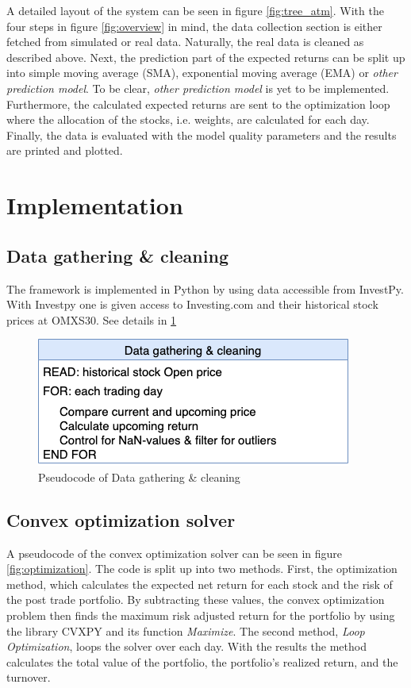 \documentclass{LTHtwocol} %
\begin{document}
A detailed layout of the system can be seen in figure \ref{fig:tree_atm}. With the four steps in figure \ref{fig:overview} in mind, the data collection section is either fetched from simulated or real data. Naturally, the real data is cleaned as described above. Next, the prediction part of the expected returns can be split up into simple moving average (SMA), exponential moving average (EMA) or \textit{other prediction model}. To be clear, \textit{other prediction model} is yet to be implemented. Furthermore, the calculated expected returns are sent to the optimization loop where the allocation of the stocks, i.e. weights, are calculated for each day. Finally, the data is evaluated with the model quality parameters and the results are printed and plotted.


\section{Implementation}

\subsection{Data gathering \& cleaning}
The framework is implemented in Python by using data accessible from InvestPy. With Investpy one is given access to Investing.com and their historical stock prices at OMXS30. See details in \ref{fig:DATA_pseud}

\begin{figure}[h]
	\centering
	\includegraphics[width=0.7\columnwidth]{Pics/DATA_pseud.png}
	\caption{Pseudocode of Data gathering \& cleaning}
	\label{fig:DATA_pseud} 
\end{figure}

\subsection{Convex optimization solver}
A pseudocode of the convex optimization solver can be seen in figure \ref{fig:optimization}. The code is split up into two methods. First, the optimization method, which calculates the expected net return for each stock and the risk of the post trade portfolio. By subtracting these values, the convex optimization problem then finds the maximum risk adjusted return for the portfolio by using the library CVXPY and its function \textit{Maximize}. The second method, \textit{Loop Optimization}, loops the solver over each day. With the results the method calculates the total value of the portfolio, the portfolio's realized return, and the turnover.
\end{document}
